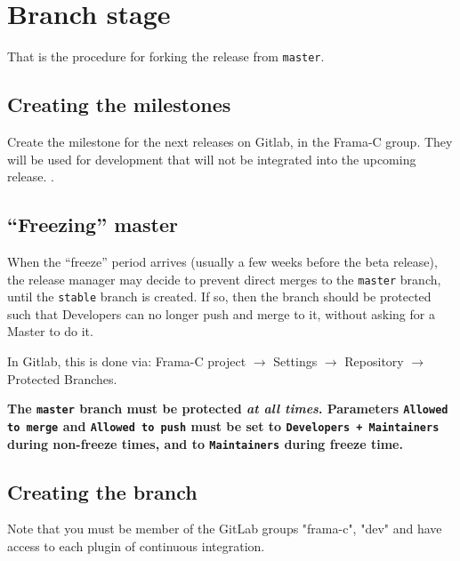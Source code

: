\chapter{Branch stage}
\label{chap:branch}

That is the procedure for forking the release from \texttt{master}.

\section{Creating the milestones}

Create the milestone for the next releases on \textsf{Gitlab},
in the Frama-C group. They will be used for development that will not
be integrated into the upcoming release.
.

\section{``Freezing'' master}

When the ``freeze'' period arrives (usually a few weeks before the beta
release), the release manager may decide to prevent direct merges to the
\texttt{master} branch, until the \texttt{stable} branch is created.
If so, then the branch should be protected such that Developers can no
longer push and merge to it, without asking for a Master to do it.

In Gitlab, this is done via: Frama-C project $\rightarrow$ Settings
$\rightarrow$ Repository $\rightarrow$ Protected Branches.

\textbf{The \texttt{master} branch must be protected \emph{at all times}.
  Parameters
  \texttt{Allowed to merge} and \texttt{Allowed to push} must be set to
  \texttt{Developers + Maintainers} during non-freeze times, and to
  \texttt{Maintainers} during freeze time.}

\section{Creating the branch}

Note that you must be member of the GitLab groups "frama-c", "dev" and have
access to each plugin of continuous integration.

